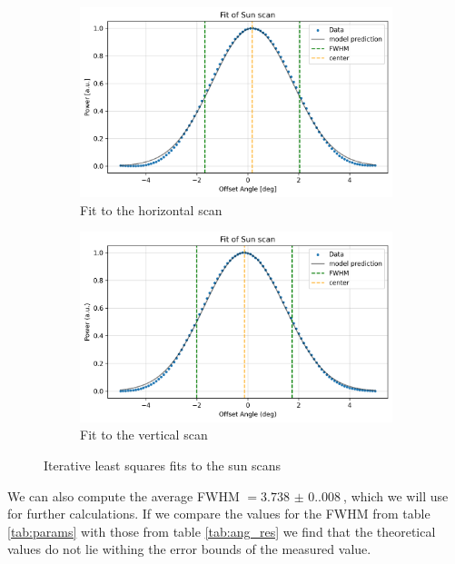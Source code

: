 \begin{figure}[H]
    \centering
    \begin{subfigure}[b]{0.45\textwidth}
        \centering
        \includegraphics[width=\textwidth]{assets/sun_scan_fit_h.png}
        \caption{Fit to the horizontal scan}
        \label{fig:sun_fit_h}
    \end{subfigure}
    \hfill
    \begin{subfigure}[b]{0.45\textwidth}
        \centering
        \includegraphics[width=\textwidth]{assets/sun_scan_fit_v.png}
        \caption{Fit to the vertical scan}
        \label{fig:sun_fit_v}
    \end{subfigure}
    \caption{Iterative least squares fits to the sun scans}
    \label{fig:sun_scan_fit}
\end{figure}
We can also compute the average FWHM $= \SI{3.738(0.008)}{}$, which we will use for further calculations.
If we compare the values for the FWHM from table \ref{tab:params} with those from table \ref{tab:ang_res}
we find that the theoretical values do not lie withing the error bounds of the measured value.
